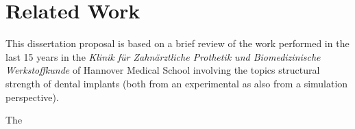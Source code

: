 \section{Related Work}
\label{sec:related-work}


This dissertation proposal is based on a brief review of the work performed in the last 15 years in the \emph{Klinik für Zahnärztliche Prothetik und Biomedizinische Werkstoffkunde} of Hannover Medical School involving the topics structural strength of dental implants (both from an experimental as also from a simulation perspective).

The \citep{dittmer2007} 